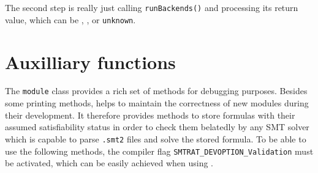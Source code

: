 The second step is really just calling \texttt{runBackends()} and processing its return value, which can be
\true, \false, or \texttt{unknown}.

\section{Auxilliary functions}
The \texttt{module} class provides a rich set of methods for debugging purposes. Besides some 
printing methods, \smtrat helps to maintain the correctness of new modules during their development.
It therefore provides methods to store formulas with their assumed satisfiability status in order
to check them belatedly by any SMT solver which is capable to parse \texttt{.smt2} files and solve
the stored formula. To be able to use the following methods, the compiler flag \texttt{SMTRAT\_DEVOPTION\_Validation}
must be activated, which can be easily achieved when using \ccmake.

